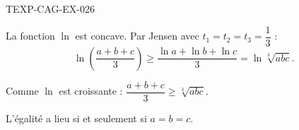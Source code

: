 \begin{corrige}{TEXP-CAG-EX-026}

La fonction $\ln$ est concave. Par Jensen avec $t_1=t_2=t_3=\dfrac{1}{3}$ :
\[ \ln\!\left(\frac{a+b+c}{3}\right) \geq \frac{\ln a + \ln b + \ln c}{3} = \ln\sqrt[3]{abc}. \]


Comme $\ln$ est croissante : $\dfrac{a+b+c}{3} \geq \sqrt[3]{abc}$.

L'égalité a lieu si et seulement si $a = b = c$.

\end{corrige}
